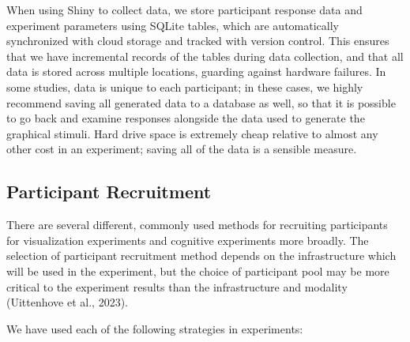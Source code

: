 \documentclass[
  10pt,
  letterpaper,
  DIV=11,
  numbers=noendperiod]{scrartcl}
\begin{document}
When using Shiny to collect data, we store participant response data and
experiment parameters using SQLite tables, which are automatically
synchronized with cloud storage and tracked with version control. This
ensures that we have incremental records of the tables during data
collection, and that all data is stored across multiple locations,
guarding against hardware failures. In some studies, data is unique to
each participant; in these cases, we highly recommend saving all
generated data to a database as well, so that it is possible to go back
and examine responses alongside the data used to generate the graphical
stimuli. Hard drive space is extremely cheap relative to almost any
other cost in an experiment; saving all of the data is a sensible
measure.

\subsection{Participant Recruitment}\label{participant-recruitment}

There are several different, commonly used methods for recruiting
participants for visualization experiments and cognitive experiments
more broadly. The selection of participant recruitment method depends on
the infrastructure which will be used in the experiment, but the choice
of participant pool may be more critical to the experiment results than
the infrastructure and modality (Uittenhove et al., 2023).

We have used each of the following strategies in experiments:
\end{document}
